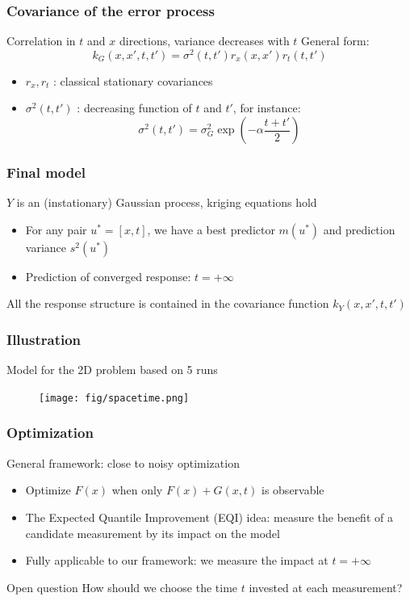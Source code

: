 \documentclass[10pt]{beamer}
\begin{document}
\frame
{
\frametitle{Covariance of the error process}
\begin{block}{Correlation in $t$ and $x$ directions, variance decreases with $t$}
General form:
$$k_G(x,x',t,t') = \sigma^2(t,t') r_x(x, x') r_t(t, t')$$

\begin{itemize}
 \item $r_x, r_t$ : classical stationary covariances
 \item $\sigma^2(t,t')$ : decreasing function of $t$ and $t'$, for instance:
$$\sigma^2(t,t') = \sigma_G^2 \exp(- \alpha \frac{t+t'}{2})$$
\end{itemize}
\end{block}
}
\frame
{
\frametitle{Final model}
\begin{block}{$Y$ is an (instationary) Gaussian process, kriging equations hold}
\begin{itemize}
 \item For any pair $u^*=[x,t]$, we have a best predictor $m(u^*)$ and prediction variance $s^2(u^*)$
 \item Prediction of converged response: $t = + \infty$
\end{itemize}
\end{block}

\begin{block}{All the response structure is contained in the covariance function $k_Y(x,x',t,t')$}
\end{block}
}
\frame
{
\frametitle{Illustration}
Model for the 2D problem based on 5 runs
\begin{figure}[h!]
	\centering
		\texttt{[image: fig/spacetime.png]}
\end{figure}
}

\frame
{
\frametitle{Optimization}
\begin{block}{General framework: close to noisy optimization}
\begin{itemize}
 \item Optimize $F(x)$ when only $F(x) + G(x,t)$ is observable
 \item The Expected Quantile Improvement (EQI) idea: measure the benefit of a candidate measurement by its impact on the model
 \item Fully applicable to our framework: we measure the impact at $t=+\infty$
\end{itemize}
\end{block}

\begin{block}{Open question}
How should we choose the time $t$ invested at each measurement?
\end{block}
}
\end{document}
